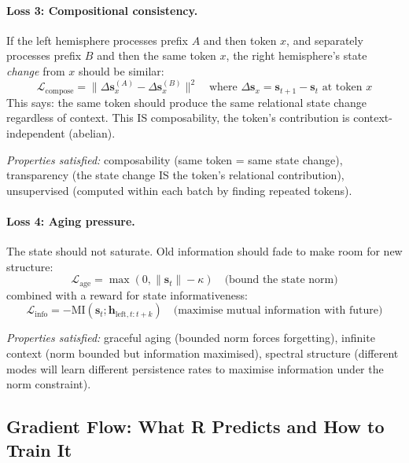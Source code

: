\documentclass[11pt, a4paper]{article}
\newcommand{\h}{\mathbf{h}}
\theoremstyle{plain}
\theoremstyle{definition}
\theoremstyle{remark}
\begin{document}
\paragraph{Loss 3: Compositional consistency.}
If the left hemisphere processes prefix $A$ and then token $x$, and separately processes prefix $B$ and then the same token $x$, the right hemisphere's state \emph{change} from $x$ should be similar:
\begin{equation}
\mathcal{L}_{\mathrm{compose}} = \| \Delta\mathbf{s}_x^{(A)} - \Delta\mathbf{s}_x^{(B)} \|^2 \quad \text{where } \Delta\mathbf{s}_x = \mathbf{s}_{t+1} - \mathbf{s}_t \text{ at token } x
\end{equation}
This says: the same token should produce the same relational state change regardless of context.
This IS composability, the token's contribution is context-independent (abelian).

\emph{Properties satisfied:} composability (same token = same state change), transparency (the state change IS the token's relational contribution), unsupervised (computed within each batch by finding repeated tokens).

\paragraph{Loss 4: Aging pressure.}
The state should not saturate. Old information should fade to make room for new structure:
\begin{equation}
\mathcal{L}_{\mathrm{age}} = \max(0, \|\mathbf{s}_t\| - \kappa) \quad \text{(bound the state norm)}
\end{equation}
combined with a reward for state informativeness:
\begin{equation}
\mathcal{L}_{\mathrm{info}} = -\mathrm{MI}(\mathbf{s}_t; \h_{\mathrm{left}, t:t+k}) \quad \text{(maximise mutual information with future)}
\end{equation}

\emph{Properties satisfied:} graceful aging (bounded norm forces forgetting), infinite context (norm bounded but information maximised), spectral structure (different modes will learn different persistence rates to maximise information under the norm constraint).

\subsection{Gradient Flow: What R Predicts and How to Train It}
\label{sec:gradient-flow}
\end{document}
